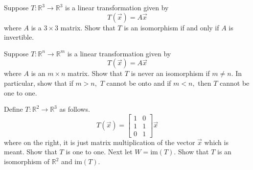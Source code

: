 \documentclass{ximera}
\begin{document}
\begin{problem}\label{prb:10.81} Suppose $T:\mathbb{R}^{3}\rightarrow \mathbb{R}^{3}$ is a linear
transformation given by
\begin{equation*}
T(\vec{x})=A\vec{x}
\end{equation*}
where $A$ is a $3\times 3$ matrix. Show that $T$ is an isomorphism if and
only if $A$ is invertible.
\end{problem}


\begin{problem}\label{prb:10.82} Suppose $T:\mathbb{R}^{n}\rightarrow \mathbb{R}^{m}$ is a linear
transformation given by
\begin{equation*}
T(\vec{x})=A\vec{x}
\end{equation*}
where $A$ is an $m\times n$ matrix. Show that $T$ is never an isomorphism if
$m\neq n$. In particular, show that if $m>n,$ $T$ cannot be onto and if $
m<n, $ then $T$ cannot be one to one.
\end{problem}


\begin{problem}\label{prb:10.83} Define $T:\mathbb{R}^{2}\rightarrow \mathbb{R}^{3}$ as follows.
\begin{equation*}
T(\vec{x})=\left[
\begin{array}{cc}
1 & 0 \\
1 & 1 \\
0 & 1
\end{array}
\right] \vec{x}
\end{equation*}
where on the right, it is just matrix multiplication of the vector $\vec{x}$
which is meant. Show that $T$ is one to one. Next let $W=\mbox{im}\left(
T\right) .$ Show that $T$ is an isomorphism of $\mathbb{R}^{2}$ and $\mbox{im
}\left( T\right) $.
\end{problem}
\end{document}
